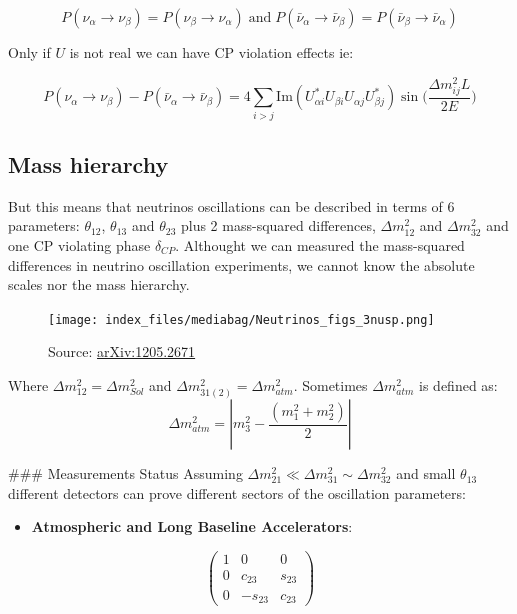 \documentclass[
  letterpaper,
  DIV=11,
  numbers=noendperiod]{scrreprt}
\providecommand{\tightlist}{%
  \setlength{\itemsep}{0pt}\setlength{\parskip}{0pt}}\usepackage{longtable,booktabs,array}
\begin{document}
\[P({\nu_\alpha} \rightarrow {\nu_\beta}) = P({\nu_\beta} \rightarrow {\nu_\alpha})\mathrm{\; and\; }P({\bar \nu_\alpha} \rightarrow {\bar \nu_\beta}) = P({\bar \nu_\beta} \rightarrow {\bar\nu_\alpha})\]

Only if \(U\) is not real we can have CP violation effects ie:

\[P(\nu_\alpha \rightarrow \nu_\beta) - P({\bar \nu_\alpha} \rightarrow {\bar \nu_\beta}) ={ 4 \sum_{i>j}\mathrm{ Im}(U_{\alpha i}^{*}U_{\beta i}U_{\alpha j}U_{\beta j}^{*})\sin(}\frac{\Delta m_{ij}^{2}L}{2E})\]

\subsection*{Mass hierarchy}\label{mass-hierarchy}

But this means that neutrinos oscillations can be described in terms of
6 parameters: \(\theta_{12}\), \(\theta_{13}\) and \(\theta_{23}\) plus
2 mass-squared differences, \(\Delta m_{12}^2\) and \(\Delta m_{32}^2\)
and one CP violating phase \(\delta_{CP}\). Althought we can measured
the mass-squared differences in neutrino oscillation experiments, we
cannot know the absolute scales nor the mass hierarchy.

\begin{figure}[H]

{\centering \texttt{[image: index\_files/mediabag/Neutrinos\_figs\_3nusp.png]}

}

\caption{Source:
\href{https://inspirehep.net/record/1114323}{arXiv:1205.2671}}

\end{figure}%

Where \(\Delta m_{12}^2 = \Delta m_{Sol}^2\) and
\(\Delta m_{31(2)}^2 = \Delta m_{atm}^2\). Sometimes
\(\Delta m_{atm}^2\) is defined as:
\[\Delta m_{atm}^2  =\left| m_3^2 - \frac{(m_1^2 + m_2^2)}{2} \right|\]

\#\#\# Measurements Status Assuming
\(\Delta m_{21}^2 \ll \Delta m_{31}^2 \sim \Delta m_{32}^2\) and small
\(\theta_{13}\) different detectors can prove different sectors of the
oscillation parameters:

\begin{itemize}
\tightlist
\item
  \textbf{Atmospheric and Long Baseline Accelerators}:
\end{itemize}

\[\begin{pmatrix} 1 & 0 & 0 \\ 0 & c_{23} & s_{23} \\ 0 & -s_{23} & c_{23} \end{pmatrix}\]
\end{document}
